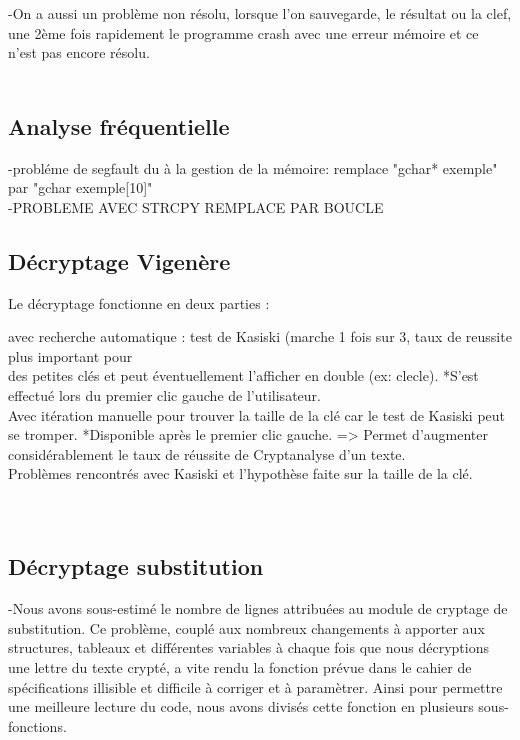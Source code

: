 \documentclass[a4]{article}
\begin{document}
	-On a aussi un problème non résolu, lorsque l'on sauvegarde, le résultat ou la clef, une 2ème fois rapidement le programme crash 
	avec une erreur mémoire et ce n'est pas encore résolu.\\
	\\
	
	\subsection{Analyse fréquentielle}
	-probléme de segfault du à la gestion de la mémoire: remplace "gchar* exemple" par "gchar exemple[10]"\\
	-PROBLEME AVEC STRCPY REMPLACE PAR BOUCLE
	\subsection{Décryptage Vigenère}
 		Le décryptage fonctionne en deux parties :
 		
 		avec recherche automatique : test de Kasiski (marche 1 fois sur 3, taux de reussite plus important pour \\
 		des petites clés et peut éventuellement l'afficher en double (ex: clecle). 
 		*S'est effectué lors du premier clic gauche de l'utilisateur. \\
 		
 		Avec itération manuelle pour trouver la taille de la clé car le test de Kasiski peut se tromper.
 		*Disponible après le premier clic gauche.
 		=> Permet d'augmenter considérablement le taux de réussite de Cryptanalyse d'un texte. \\
  		
 		Problèmes rencontrés avec Kasiski et l'hypothèse faite sur la taille de la clé. \\
  		 \\ \\
	
	\subsection{Décryptage substitution}
	 -Nous avons sous-estimé le nombre de lignes attribuées au module de cryptage de substitution.
	  Ce problème, couplé aux nombreux changements à apporter aux structures, tableaux et différentes
	  variables à chaque fois que nous décryptions une lettre du texte crypté, a vite rendu la fonction
	  prévue dans le cahier de spécifications illisible et difficile à corriger et à paramètrer. Ainsi 
	  pour permettre une meilleure lecture du code, nous avons divisés cette fonction en plusieurs sous-fonctions. \\ \\
    
\end{document}
